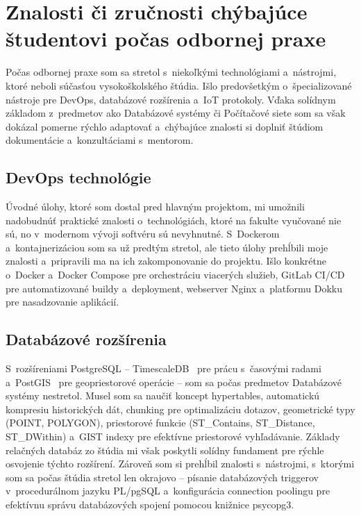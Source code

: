 \chapter{Znalosti či zručnosti chýbajúce študentovi počas odbornej praxe}
\label{sec:Chybejici}


Počas odbornej praxe som sa stretol s~niekoľkými technológiami a~nástrojmi, ktoré neboli súčasťou vysokoškolského štúdia. Išlo predovšetkým o~špecializované nástroje pre DevOps, databázové rozšírenia a~IoT protokoly. Vďaka solídnym základom z~predmetov ako Databázové systémy či Počítačové siete som sa však dokázal pomerne rýchlo adaptovať a~chýbajúce znalosti si doplniť štúdiom dokumentácie a~konzultáciami s~mentorom.

\section{DevOps technológie}
\label{sec:ChybDevOps}

Úvodné úlohy, ktoré som dostal pred hlavným projektom, mi umožnili nadobudnúť praktické znalosti o~technológiách, ktoré na fakulte vyučované nie sú, no v~modernom vývoji softvéru sú nevyhnutné. S~Dockerom a~kontajnerizáciou som sa už predtým stretol, ale tieto úlohy prehĺbili moje znalosti a~pripravili ma na ich zakomponovanie do projektu. Išlo konkrétne o~Docker a~Docker Compose pre orchestráciu viacerých služieb, GitLab CI/CD pre automatizované buildy a~deployment, webserver Nginx a~platformu Dokku pre nasadzovanie aplikácií.

\section{Databázové rozšírenia}
\label{sec:ChybDatabazy}

S~rozšíreniami PostgreSQL -- TimescaleDB~\cite{timescaledb_docs} pre prácu s~časovými radami a~PostGIS~\cite{postgis_docs} pre geopriestorové operácie -- som sa počas predmetov Databázové systémy nestretol. Musel som sa naučiť koncept hypertables, automatickú kompresiu historických dát, chunking pre optimalizáciu dotazov, geometrické typy (POINT, POLYGON), priestorové funkcie (ST\_Contains, ST\_Distance, ST\_DWithin) a~GIST indexy pre efektívne priestorové vyhľadávanie. Základy relačných databáz zo štúdia mi však poskytli solídny fundament pre rýchle osvojenie týchto rozšírení. Zároveň som si prehĺbil znalosti s~nástrojmi, s~ktorými som sa počas štúdia stretol len okrajovo -- písanie databázových triggerov v~procedurálnom jazyku PL/pgSQL a~konfigurácia connection poolingu pre efektívnu správu databázových spojení pomocou knižnice psycopg3.

